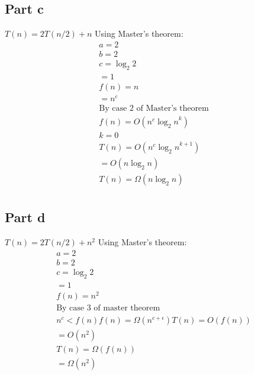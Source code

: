 \documentclass{article}
\begin{document}
\subsection*{Part c}

$T(n)=2T(n/2)+ n$
Using Master's theorem:
\begin{align}
a=2\\
b=2\\
c=\log_2 2\\
 =1\\
f(n)=n\\
=n^c\\
\text{By case 2 of Master's theorem}\\
f(n)=O(n^c {\log_2 n}^k)\\
k=0\\
T(n)=O(n^c {\log_2 n}^{k+1})\\
    =O(n\log_2 n)\\
T(n)=\Omega(n\log_2 n)\\
\end{align}


\subsection*{Part d}

$T(n)=2T(n/2)+ n^2$
Using Master's theorem:
\begin{align}
a=2\\
b=2\\
c=\log_2 2\\
 =1\\
f(n)=n^2\\
\text{By case 3 of master theorem}\\
n^c<f(n)
f(n)=\Omega(n^{c+\epsilon})
T(n)=O(f(n))\\
    =O(n^2)\\
T(n)=\Omega(f(n))\\
    =\Omega(n^2)\\
\end{align}
\end{document}
